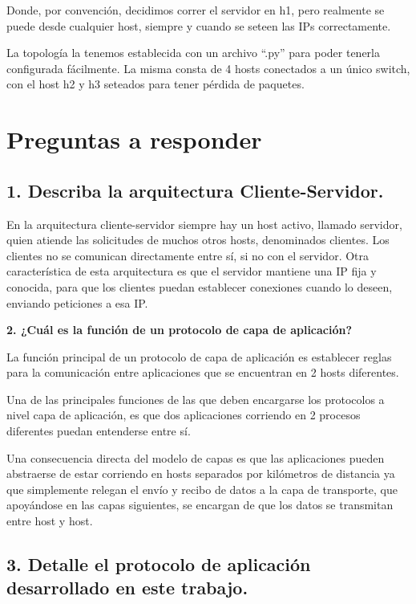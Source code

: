 \documentclass{article}
\begin{document}
Donde, por convención, decidimos correr el servidor en h1, pero
realmente se puede desde cualquier host, siempre y cuando se seteen las
IPs correctamente.

La topología la tenemos establecida con un archivo ``.py'' para poder
tenerla configurada fácilmente. La misma consta de 4 hosts conectados a
un único switch, con el host h2 y h3 seteados para tener pérdida de
paquetes.

\section{\texorpdfstring{\textbf{Preguntas a responder}}{Preguntas a responder}}\label{preguntas-a-responder}

\subsection{\texorpdfstring{\textbf{1. Describa la arquitectura Cliente-Servidor.}}{1. Describa la arquitectura Cliente-Servidor.}}\label{describa-la-arquitectura-cliente-servidor.}

En la arquitectura cliente-servidor siempre hay un host activo, llamado servidor, quien atiende las solicitudes de muchos otros hosts, denominados clientes. Los clientes no se comunican directamente entre sí, si no con el servidor. Otra característica de esta arquitectura es que el servidor mantiene una IP fija y conocida, para que los clientes puedan establecer conexiones cuando lo deseen, enviando peticiones a esa IP.

\textbf{2. ¿Cuál es la función de un protocolo de capa de aplicación?}

La función principal de un protocolo de capa de aplicación es establecer
reglas para la comunicación entre aplicaciones que se encuentran en 2
hosts diferentes.

Una de las principales funciones de las que deben encargarse los
protocolos a nivel capa de aplicación, es que dos aplicaciones corriendo
en 2 procesos diferentes puedan entenderse entre sí.

Una consecuencia directa del modelo de capas es que las aplicaciones
pueden abstraerse de estar corriendo en hosts separados por kilómetros
de distancia ya que simplemente relegan el envío y recibo de datos a la
capa de transporte, que apoyándose en las capas siguientes, se encargan
de que los datos se transmitan entre host y host.

\subsection{\texorpdfstring{\textbf{3. Detalle el protocolo de
aplicación desarrollado en este trabajo.}}{3. Detalle el protocolo de aplicación desarrollado en este trabajo.}}\label{detalle-el-protocolo-de-aplicaciuxf3n-desarrollado-en-este-trabajo.}
\end{document}
